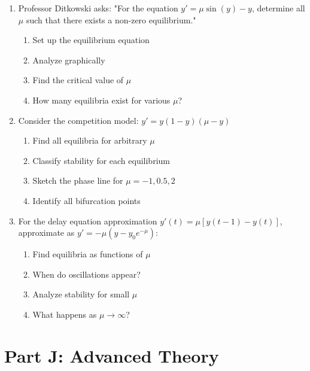 \documentclass[12pt]{article}
\begin{document}
\begin{enumerate}[start=23]
    \item Professor Ditkowski asks: "For the equation $y' = \mu \sin(y) - y$, determine all $\mu$ such that there exists a non-zero equilibrium."
    \begin{enumerate}[label=(\alph*)]
        \item Set up the equilibrium equation
        \item Analyze graphically
        \item Find the critical value of $\mu$
        \item How many equilibria exist for various $\mu$?
    \end{enumerate}
    
    \item Consider the competition model: $y' = y(1 - y)(\mu - y)$
    \begin{enumerate}[label=(\alph*)]
        \item Find all equilibria for arbitrary $\mu$
        \item Classify stability for each equilibrium
        \item Sketch the phase line for $\mu = -1, 0.5, 2$
        \item Identify all bifurcation points
    \end{enumerate}
    
    \item For the delay equation approximation $y'(t) = \mu[y(t-1) - y(t)]$, approximate as $y' = -\mu(y - y_0e^{-\mu})$:
    \begin{enumerate}[label=(\alph*)]
        \item Find equilibria as functions of $\mu$
        \item When do oscillations appear?
        \item Analyze stability for small $\mu$
        \item What happens as $\mu \to \infty$?
    \end{enumerate}
\end{enumerate}

\section*{Part J: Advanced Theory}
\end{document}
